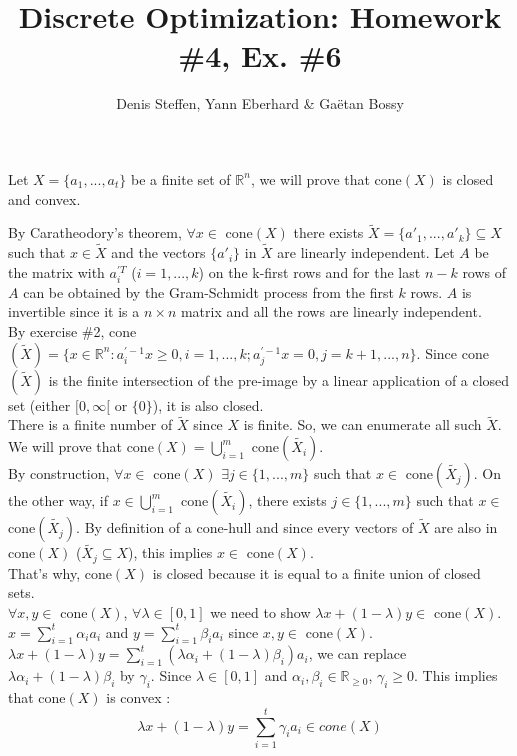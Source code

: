 \documentclass[a4paper,11pt,french]{article}
\title{Discrete Optimization: Homework \#4, Ex. \#6}
\author{Denis Steffen, Yann Eberhard \& Gaëtan Bossy}
\begin{document}
    
    \maketitle
    Let $X=\{ a_{1}, ... , a_{t}\}$ be a finite set of $\mathbb{R}^{n}$, we will prove that cone$(X)$ is closed and convex.
    
    By Caratheodory's theorem, $\forall x \in$ cone$(X)$ there exists $\widetilde{X}=\{ a'_{1}, ... , a'_{k}\} \subseteq X$ such that $x \in \widetilde{X}$ and the vectors $\{ a'_{i}\}$ in $\widetilde{X}$ are linearly independent. 
    Let $A$ be the matrix with $a_{i}^{\prime T}$ ($i=1, ... , k$) on the k-first rows and for the last $n-k$ rows of $A$ can be obtained by the Gram-Schmidt process from the first $k$ rows. $A$ is invertible since it is a $n \times n$ matrix and all the rows are linearly independent.
    \\
    By exercise \#2, cone$(\widetilde{X})=\{ x\in \mathbb{R}^{n} : a_{ i}^{\prime -1}x \geq 0, i=1, ... , k ; a_{j}^{\prime -1}x = 0, j=k+1, ... , n  \}$.
    Since cone$(\widetilde{X})$ is the finite intersection of the pre-image by a linear application of a closed set (either $[0, \infty[$ or $\{0\}$), it is also closed. 
    \\
    There is a finite number of $\widetilde{X}$ since $X$ is finite. So, we can enumerate all such $\widetilde{X}$. We will prove that cone$(X)=\displaystyle{\bigcup_{ i=1}^{m}}$ cone$(\widetilde{X_{i}})$. 
    \\
    By construction, $\forall x \in$ cone$(X)$ $\exists j \in \{1, ..., m\}$ such that $x \in$ cone$(\widetilde{X_{j}})$. On the other way, if $x \in \displaystyle{\bigcup_{ i=1}^{m}}$ cone$(\widetilde{X_{i}})$, there exists $j \in \{1, ... , m \}$ such that $x \in$ cone$(\widetilde{X_{j}})$. 
    By definition of a cone-hull and since every vectors of $\widetilde{X}$ are also in cone$(X)$ ($\widetilde{X_{j}} \subseteq X$), this implies $x \in$ cone$(X)$.
    \\
    That's why, cone$(X)$ is closed because it is equal to a finite union of closed sets.
    \\

    $\forall x, y \in$ cone$(X)$, $\forall \lambda \in [0,1]$ we need to show $\lambda 
    x +(1-\lambda)y \in$ cone$(X)$. $x=\displaystyle{\sum_{i=1}^{t}} \alpha_{i} a_{i}$ and $y=\displaystyle{\sum_{i=1}^{t}} \beta_{i} a_{i}$ since $x,y \in$ cone$(X)$.
    \\
    $\lambda x +(1-\lambda)y = \displaystyle{\sum_{i=1}^{t}} (\lambda \alpha_{i} + (1-\lambda)\beta_{i}) a_{i}$, we can replace $\lambda \alpha_{i} + (1-\lambda)\beta_{i}$ by $\gamma_{i}$. Since $\lambda \in [0,1]$ and $\alpha_{i}, \beta_{i} \in \mathbb{R}_{\geq 0}$, $\gamma_{i} \geq 0$. This implies that cone$(X)$ is convex :
    \begin{equation*}
    \lambda x +(1-\lambda)y = \displaystyle{\sum_{i=1}^{t}} \gamma_{i} a_{i} \in cone(X)
    \end{equation*}
    
    
    
\end{document}
